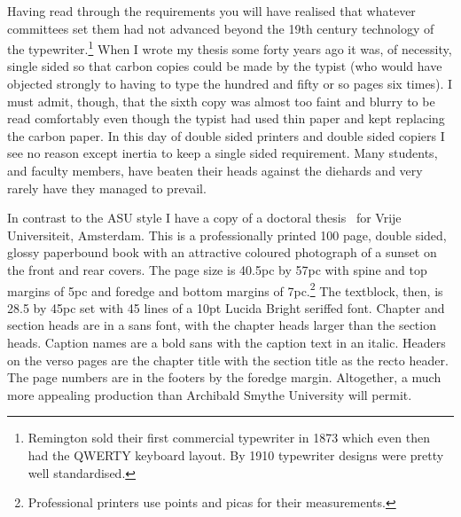     Having read through the requirements you will have realised
that whatever committees set them had not advanced beyond the 19th century
technology of the typewriter.\footnote{Remington sold 
their first commercial typewriter in 1873 which even then had the QWERTY 
keyboard layout. By 1910 typewriter designs were pretty well standardised.} 
When I wrote my thesis some forty years ago
it was, of necessity, single sided so that carbon copies could be made
by the typist (who would have objected strongly to having 
to type the hundred
and fifty or so pages six times). I must admit, though, that the sixth copy
was almost too faint and blurry to be read comfortably even though the typist
had used thin paper and kept replacing the carbon paper. 
In this day of double sided printers and double sided copiers I see no 
reason except inertia to keep a single sided requirement. Many students, 
and faculty members, have beaten their heads against
the diehards and very rarely have they managed to prevail.

   In contrast to the ASU style I have a copy of a doctoral
thesis~\cite{SNEEP04} for Vrije Universiteit, Amsterdam. This is a
professionally printed 100 page, double sided, glossy paperbound book with an 
attractive coloured 
photograph of a sunset on the front and rear covers. The page size is 40.5pc by
57pc with spine and top margins of 5pc and foredge and bottom margins of
7pc.\footnote{Professional printers use points and picas for their 
measurements.}  The textblock, then, is 28.5 by 45pc set with 45 lines of 
a 10pt Lucida Bright seriffed font.
Chapter and section heads are in a sans font, with the chapter heads larger
than the section heads. Caption names are a bold sans with the caption text 
in an italic. Headers on the verso pages are the chapter title with the section
title as the recto header. The page numbers are in the footers by the foredge
margin. Altogether, a much more appealing production 
than Archibald Smythe University will permit.

